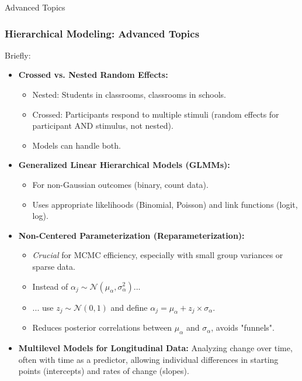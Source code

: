 \documentclass[aspectratio=169]{beamer}
\begin{document}
\begin{frame}[fragile]{Advanced Topics}
    \frametitle{Hierarchical Modeling: Advanced Topics}
    Briefly:
    \begin{itemize}
        \item \textbf{Crossed vs. Nested Random Effects:}
        \begin{itemize}
            \item Nested: Students in classrooms, classrooms in schools.
            \item Crossed: Participants respond to multiple stimuli (random effects for participant AND stimulus, not nested).
            \item Models can handle both.
        \end{itemize}
        \pause
        \item \textbf{Generalized Linear Hierarchical Models (GLMMs):}
        \begin{itemize}
            \item For non-Gaussian outcomes (binary, count data).
            \item Uses appropriate likelihoods (Binomial, Poisson) and link functions (logit, log).
        \end{itemize}
        \pause
        \item \textbf{Non-Centered Parameterization (Reparameterization):}
        \begin{itemize}
            \item \emph{Crucial} for MCMC efficiency, especially with small group variances or sparse data.
            \item Instead of $\alpha_j \sim \mathcal{N}(\mu_{\alpha}, \sigma^2_{\alpha})$...
            \item ... use $z_j \sim \mathcal{N}(0, 1)$ and define $\alpha_j = \mu_{\alpha} + z_j \times \sigma_{\alpha}$.
            \item Reduces posterior correlations between $\mu_{\alpha}$ and $\sigma_{\alpha}$, avoids "funnels".
        \end{itemize}
        \pause
        \item \textbf{Multilevel Models for Longitudinal Data:} Analyzing change over time, often with time as a predictor, allowing individual differences in starting points (intercepts) and rates of change (slopes).
    \end{itemize}
\end{frame}
\end{document}

